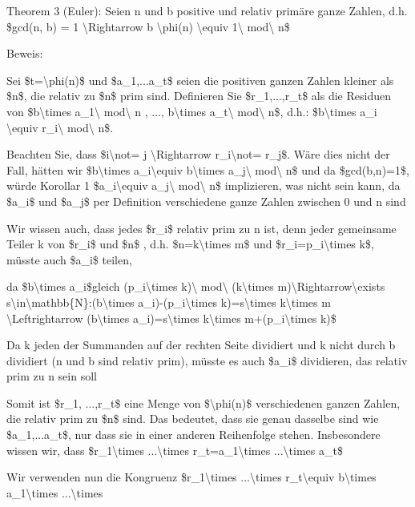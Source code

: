 \documentclass[a4paper]{article}
\begin{document}
\begin{multicols}{3}
\begin{itemize*}
\begin{itemize*}
            \end{itemize*}
            \item Theorem 3 (Euler): Seien n und b positive und relativ primäre ganze
            Zahlen, d.h. \$gcd(n, b) = 1 \textbackslash Rightarrow b
            \textbackslash phi(n) \textbackslash equiv 1\textbackslash{}
            mod\textbackslash{} n\$
            \begin{itemize*}
                  \item Beweis:
                  \begin{itemize*} \item Sei \$t=\textbackslash phi(n)\$ und \$a\_1,...a\_t\$ seien die positiven ganzen Zahlen kleiner als \$n\$, die relativ zu \$n\$ prim sind. Definieren Sie \$r\_1,...,r\_t\$ als die Residuen von \$b\textbackslash times a\_1\textbackslash{} mod\textbackslash{} n , ..., b\textbackslash times a\_t\textbackslash{} mod\textbackslash{} n\$, d.h.: \$b\textbackslash times a\_i \textbackslash equiv r\_i\textbackslash{} mod\textbackslash{} n\$. \item Beachten Sie, dass \$i\textbackslash not= j \textbackslash Rightarrow r\_i\textbackslash not= r\_j\$. Wäre dies nicht der Fall, hätten wir \$b\textbackslash times a\_i\textbackslash equiv b\textbackslash times a\_j\textbackslash{} mod\textbackslash{} n\$ und da \$gcd(b,n)=1\$, würde Korollar 1 \$a\_i\textbackslash equiv a\_j\textbackslash{} mod\textbackslash{} n\$ implizieren, was nicht sein kann, da \$a\_i\$ und \$a\_j\$ per Definition verschiedene ganze Zahlen zwischen 0 und n sind \item Wir wissen auch, dass jedes \$r\_i\$ relativ prim zu n ist, denn jeder gemeinsame Teiler k von \$r\_i\$ und \$n\$ , d.h. \$n=k\textbackslash times m\$ und \$r\_i=p\_i\textbackslash times k\$, müsste auch \$a\_i\$ teilen, \item da \$b\textbackslash times a\_i\$gleich (p\_i\textbackslash times k)\textbackslash{} mod\textbackslash{} (k\textbackslash times m)\textbackslash Rightarrow\textbackslash exists s\textbackslash in\textbackslash mathbb\{N\}:(b\textbackslash times a\_i)-(p\_i\textbackslash times k)=s\textbackslash times k\textbackslash times m \textbackslash Leftrightarrow (b\textbackslash times a\_i)=s\textbackslash times k\textbackslash times m+(p\_i\textbackslash times k)\$ \item Da k jeden der Summanden auf der rechten Seite dividiert und k nicht durch b dividiert (n und b sind relativ prim), müsste es auch \$a\_i\$ dividieren, das relativ prim zu n sein soll \item Somit ist \$r\_1, ...,r\_t\$ eine Menge von \$\textbackslash phi(n)\$ verschiedenen ganzen Zahlen, die relativ prim zu \$n\$ sind. Das bedeutet, dass sie genau dasselbe sind wie \$a\_1,...a\_t\$, nur dass sie in einer anderen Reihenfolge stehen. Insbesondere wissen wir, dass \$r\_1\textbackslash times ...\textbackslash times r\_t=a\_1\textbackslash times ...\textbackslash times a\_t\$ \item Wir verwenden nun die Kongruenz \$r\_1\textbackslash times ...\textbackslash times r\_t\textbackslash equiv b\textbackslash times a\_1\textbackslash times ...\textbackslash times 
\end{itemize*}
\end{itemize*}
\end{multicols}
\end{document}
